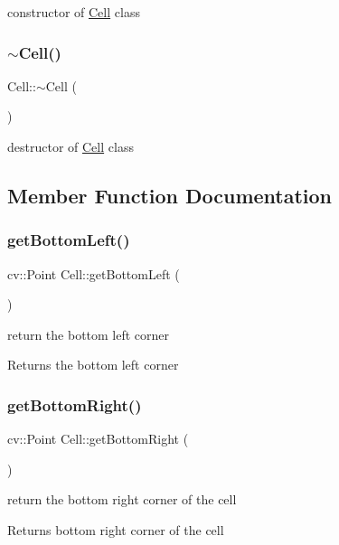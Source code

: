 constructor of \mbox{\hyperlink{class_cell}{Cell}} class \mbox{\label{class_cell_a9fa559f7a28e2b4336c6879ca09304d8}} 
\subsubsection{\texorpdfstring{$\sim$\+Cell()}{~Cell()}}
{\footnotesize\ttfamily Cell\+::$\sim$\+Cell (\begin{DoxyParamCaption}{ }\end{DoxyParamCaption})}

destructor of \mbox{\hyperlink{class_cell}{Cell}} class 

\subsection{Member Function Documentation}
\mbox{\label{class_cell_a1946142c5e112176e1cd20cc6d07f831}} 
\subsubsection{\texorpdfstring{get\+Bottom\+Left()}{getBottomLeft()}}
{\footnotesize\ttfamily cv\+::\+Point Cell\+::get\+Bottom\+Left (\begin{DoxyParamCaption}{ }\end{DoxyParamCaption})}

return the bottom left corner \begin{DoxyReturn}{Returns}
the bottom left corner 
\end{DoxyReturn}
\mbox{\label{class_cell_afa1704102095fd55ac036f7d290eed05}} 
\subsubsection{\texorpdfstring{get\+Bottom\+Right()}{getBottomRight()}}
{\footnotesize\ttfamily cv\+::\+Point Cell\+::get\+Bottom\+Right (\begin{DoxyParamCaption}{ }\end{DoxyParamCaption})}

return the bottom right corner of the cell \begin{DoxyReturn}{Returns}
bottom right corner of the cell 
\end{DoxyReturn}
\mbox{\label{class_cell_a03becce6b307d86848e9563eb08ac2b3}} 
